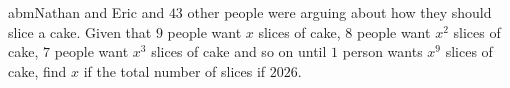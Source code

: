 abmNathan and Eric and $43$ other people were arguing about how they should slice a cake. Given that $9$ people want $x$ slices of cake, $8$ people want $x^2$ slices of cake, $7$ people want $x^3$ slices of cake and so on until $1$ person wants $x^9$ slices of cake, find $x$ if the total number of slices if $2026$.
